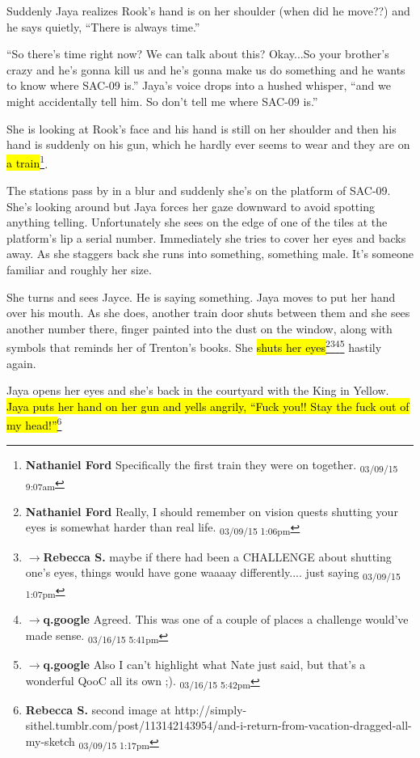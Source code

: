 Suddenly Jaya realizes Rook's hand is on her shoulder (when did he move??) and he says quietly, ``There is always time.''

``So there's time right now?  We can talk about this?  Okay...So your brother's crazy and he's gonna kill us and he's gonna make us do something and he wants to know where SAC-09 is.'' Jaya's voice drops into a hushed whisper, ``and we might accidentally tell him.  So don't tell me where SAC-09 is.''



She is looking at Rook's face and his hand is still on her shoulder and then his hand is suddenly on his gun, which he hardly ever seems to wear and they are on \hl{a train}\footnote{\textbf{Nathaniel Ford }Specifically the first train they were on together. \textsubscript{03/09/15 9:07am}}.

The stations pass by in a blur and suddenly she's on the platform of SAC-09.  She's looking around but Jaya forces her gaze downward to avoid spotting anything telling.  Unfortunately she sees on the edge of one of the tiles at the platform's lip a serial number.  Immediately she tries to cover her eyes and backs away.  As she staggers back she runs into something, something male.  It's someone familiar and roughly her size.



She turns and sees Jayce.  He is saying something.  Jaya moves to put her hand over his mouth.  As she does, another train door shuts between them and she sees another number there, finger painted into the dust on the window, along with symbols that reminds her of Trenton's books.  She \hl{shuts her eyes}\footnote{\textbf{Nathaniel Ford }Really, I should remember on vision quests shutting your eyes is somewhat harder than real life. \textsubscript{03/09/15 1:06pm}}\footnote{$\rightarrow$\textbf{Rebecca S. }maybe if there had been a CHALLENGE about shutting one's eyes, things would have gone waaaay differently....  
just saying \textsubscript{03/09/15 1:07pm}}\footnote{$\rightarrow$\textbf{q.google }Agreed.  This was one of a couple of places a challenge would've made sense. \textsubscript{03/16/15 5:41pm}}\footnote{$\rightarrow$\textbf{q.google }Also I can't highlight what Nate just said, but that's a wonderful QooC all its own ;). \textsubscript{03/16/15 5:42pm}} hastily again.



Jaya opens her eyes and she's back in the courtyard with the King in Yellow.  \hl{Jaya puts her hand on her gun and yells angrily, ``Fuck you!!  Stay the fuck out of my head!''}\footnote{\textbf{Rebecca S. }second image at http://simply-sithel.tumblr.com/post/113142143954/and-i-return-from-vacation-dragged-all-my-sketch \textsubscript{03/09/15 1:17pm}} 





